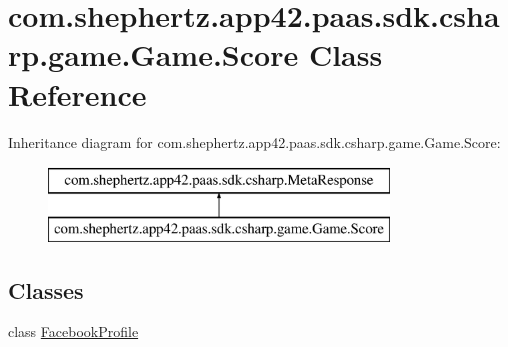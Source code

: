 \hypertarget{classcom_1_1shephertz_1_1app42_1_1paas_1_1sdk_1_1csharp_1_1game_1_1_game_1_1_score}{\section{com.\+shephertz.\+app42.\+paas.\+sdk.\+csharp.\+game.\+Game.\+Score Class Reference}
\label{classcom_1_1shephertz_1_1app42_1_1paas_1_1sdk_1_1csharp_1_1game_1_1_game_1_1_score}
}
Inheritance diagram for com.\+shephertz.\+app42.\+paas.\+sdk.\+csharp.\+game.\+Game.\+Score\+:\begin{figure}[H]
\begin{center}
\leavevmode
\includegraphics[height=2.000000cm]{classcom_1_1shephertz_1_1app42_1_1paas_1_1sdk_1_1csharp_1_1game_1_1_game_1_1_score}
\end{center}
\end{figure}
\subsection*{Classes}
\begin{DoxyCompactItemize}
\item 
class \hyperlink{classcom_1_1shephertz_1_1app42_1_1paas_1_1sdk_1_1csharp_1_1game_1_1_game_1_1_score_1_1_facebook_profile}{Facebook\+Profile}
\end{DoxyCompactItemize}
